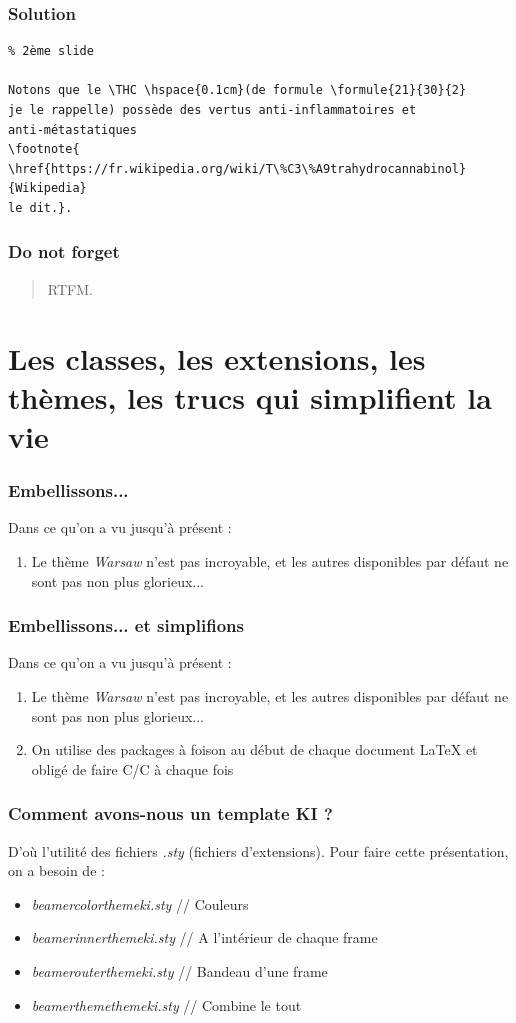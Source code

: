 \documentclass[handout]{beamer}
\newcommand{\THC}{tétrahydrocannabinol}
\newcommand{\formule}[3]{\textbf{C}\textsubscript{#1}\textbf{H}\textsubscript{#2}\textbf{O}\textsubscript{#3}}
\begin{document}
\begin{frame}[fragile=singleslide]
\frametitle{Solution}
\footnotesize
\begin{verbatim}
% 2ème slide

Notons que le \THC \hspace{0.1cm}(de formule \formule{21}{30}{2} 
je le rappelle) possède des vertus anti-inflammatoires et 
anti-métastatiques 
\footnote{
\href{https://fr.wikipedia.org/wiki/T\%C3\%A9trahydrocannabinol}
{Wikipedia} 
le dit.}.

\end{verbatim}
\end{frame}

\begin{frame}
	\frametitle{Do not forget}
	\centering
	\begin{quote}
		RTFM.
	\end{quote}
\end{frame}

\section{Les classes, les extensions, les thèmes, les trucs qui simplifient la vie}

\begin{frame}
\frametitle{Embellissons...}
Dans ce qu'on a vu jusqu'à présent :
\begin{enumerate}
	\item Le thème \textit{Warsaw} n'est pas incroyable, et les autres disponibles par défaut ne sont pas non plus glorieux...
\end{enumerate}
\end{frame}

\begin{frame}
\frametitle{Embellissons... et simplifions}
Dans ce qu'on a vu jusqu'à présent :
\begin{enumerate}
	\item Le thème \textit{Warsaw} n'est pas incroyable, et les autres disponibles par défaut ne sont pas non plus glorieux...
	\item On utilise des packages à foison au début de chaque document \LaTeX \vspace{1cm} et obligé de faire C/C à chaque fois
\end{enumerate}
\end{frame}

\begin{frame}
\frametitle{Comment avons-nous un template KI ?}
	D'où l'utilité des fichiers \textit{.sty} (fichiers d'extensions). Pour faire cette présentation, on a besoin de :
	\begin{itemize}
		\item \textit{beamercolorthemeki.sty} // Couleurs
		\item \textit{beamerinnerthemeki.sty} // A l'intérieur de chaque frame
		\item \textit{beamerouterthemeki.sty} // Bandeau d'une frame
		\item \textit{beamerthemethemeki.sty} // Combine le tout
	\end{itemize}
\end{frame}
\end{document}
